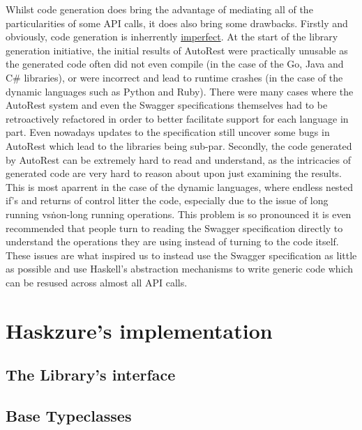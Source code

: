 \documentclass[11pt]{report}
\begin{document}
Whilst code generation does bring the advantage of mediating all of the
particularities of some API calls, it does also bring some drawbacks. \newline
Firstly and obviously, code generation is inherrently \ul{imperfect}. At the
start of the library generation initiative, the initial results of AutoRest
were practically unusable as the generated code often did not even compile (in the
case of the Go, Java and C\# libraries), or were incorrect and lead to runtime
crashes (in the case of the dynamic languages such as Python and Ruby). There
were many cases where the AutoRest system and even the Swagger specifications
themselves had to be retroactively refactored in order to better facilitate
support for each language in part. Even nowadays updates to the specification
still uncover some bugs in AutoRest which lead to the libraries being sub-par.
\newline
Secondly, the code generated by AutoRest can be extremely hard to read and
understand, as the intricacies of generated code are very hard to reason about
upon just examining the results. This is most aparrent in the case of the
dynamic languages, where endless nested if's and returns of control litter the
code, especially due to the issue of long running vs\. non-long running
operations. This problem is so pronounced it is even recommended that people
turn to reading the Swagger specification directly to understand the operations
they are using instead of turning to the code itself. \newline
These issues are what inspired us to instead use the Swagger specification as
little as possible and use Haskell's abstraction mechanisms to write generic
code which can be resused across almost all API calls.


\chapter{Haskzure's implementation}

\section{The Library's interface} %

\section{Base Typeclasses}
\end{document}
